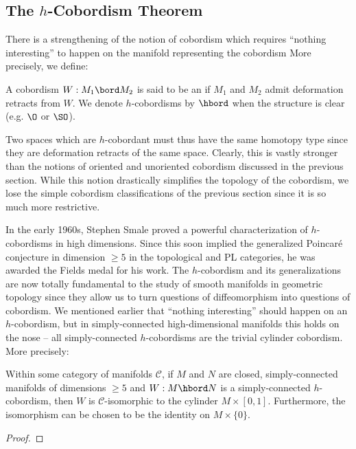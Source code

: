 \subsection{The $h$-Cobordism Theorem}

There is a strengthening of the notion of cobordism which requires ``nothing interesting'' to happen on the manifold representing the cobordism
More precisely, we define:
\begin{definition}
	A cobordism $W : M_1\bord M_2$ is said to be an  if $M_1$ and $M_2$ admit deformation retracts from $W$. We denote $h$-cobordisms by $\hbord$ when the structure is clear (e.g. $\O$ or $\SO$).
\end{definition}

Two spaces which are $h$-cobordant must thus have the same homotopy type since they are deformation retracts of the same space. Clearly, this is vastly stronger than the notions of oriented and unoriented cobordism discussed in the previous section. While this notion drastically simplifies the topology of the cobordism, we lose the simple cobordism classifications of the previous section since it is so much more restrictive. 

In the early 1960s, Stephen Smale proved \cite{smale1961generalized} a powerful characterization of $h$-cobordisms in high dimensions. Since this soon implied the generalized Poincar\'e conjecture in dimension $\geq 5$ in the topological and PL categories, he was awarded the Fields medal for his work. 
The $h$-cobordism and its generalizations are now totally fundamental to the study of smooth manifolds in geometric topology since they allow us to turn questions of diffeomorphism into questions of cobordism.
We mentioned earlier that ``nothing interesting'' should happen on an $h$-cobordism, but in simply-connected high-dimensional manifolds this holds on the nose -- all simply-connected $h$-cobordisms are the trivial cylinder cobordism. More precisely:

\begin{theorem}[$h$-cobordism]\label{thm:h-cobordism}
	Within some category of manifolds $\mathscr{C}$, if $M$ and $N$ are closed, simply-connected manifolds of dimensions $\geq 5$ and $W : M \hbord N$ is a simply-connected $h$-cobordism, then $W$ is $\mathscr{C}$-isomorphic to the cylinder $M\times [0,1]$. Furthermore, the isomorphism can be chosen to be the identity on $M\times \{0\}$.
\end{theorem}
\begin{proof}
\end{proof}

